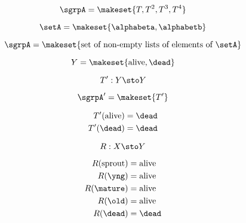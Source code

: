 {\begin{forslides}
        \begin{equation}
            \sgrpA = \makeset{T, T^2, T^3, T^4 }
        \end{equation}

        \begin{equation}
            \setA = \makeset{ \alphabeta, \alphabetb }
        \end{equation}

        \begin{equation}
            \sgrpA = \makeset{ \text{set of non-empty lists of elements of }\setA}
        \end{equation}

        \begin{equation}
            Y = \makeset{ \text{alive}, \dead }
        \end{equation}

        \begin{equation}
            T' : Y \sto Y
        \end{equation}

        \begin{equation}
            \sgrpA' = \makeset{T' }
        \end{equation}

        \begin{equation}\begin{aligned}
                T'(\text{alive}) & =  \dead \\
                T' (\dead)       & = \dead
            \end{aligned}\end{equation}

        \begin{equation}
            R: X \sto Y
        \end{equation}

        \begin{equation}\begin{aligned}
                R(\text{sprout}) & = \text{alive} \\
                R(\yng)          & =  \text{alive} \\
                R(\mature)       & = \text{alive} \\
                R( \old)         & = \text{alive} \\
                R (\dead)        & = \dead
            \end{aligned}\end{equation}


\end{forslides}}
